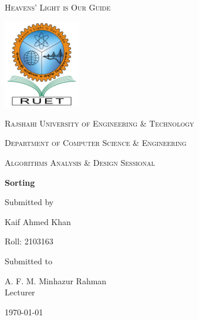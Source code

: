 \documentclass[12pt,a4paper]{article}
\newcommand{\univ}{Rajshahi University of Engineering \& Technology}
\newcommand{\thedept}{Department of Computer Science \& Engineering}
\newcommand{\thecourse}{Algorithms Analysis \& Design Sessional}
\newcommand{\thetitle}{Sorting}
\newcommand{\theauthor}{Kaif Ahmed Khan}
\newcommand{\thesupervisor}{A. F. M. Minhazur Rahman}
\newcommand{\lec}{Lecturer}
\newcommand{\thedesignation}{\lec}
\begin{document}
\begin{titlepage}
\centering
{\scshape Heavens' Light is Our Guide\par}\vspace{.25cm}
\includegraphics[width=0.25\textwidth]{logo}\par\vspace{1cm}
{\scshape\LARGE \univ\par}
\vspace{.5cm}
{\scshape\Large \thedept\par}
\vspace{1cm}
{\scshape\Large \thecourse\par}
\vspace{1cm}
{\huge\bfseries \thetitle\par}
\vspace{1cm}
Submitted by\par
{\Large \theauthor\par}
{\Large Roll: 2103163\par}
\vfill
Submitted to\par
{\Large \thesupervisor\\\thedesignation\par}
\vfill
{\large \today\par}
\end{titlepage}
\tableofcontents
\newpage
\listoflistings
\listoffigures
\newpage

\end{document}
